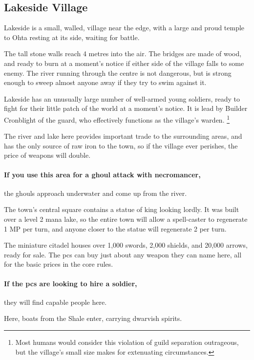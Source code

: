 \subsection{Lakeside Village}
\label{lakeside}


Lakeside is a small, walled, village near the \gls{edge}, with a large and proud temple to Ohta resting at its side, waiting for battle.

The tall stone walls reach 4 metres into the air.
The bridges are made of wood, and ready to burn at a moment's notice if either side of the village falls to some enemy.
The river running through the centre is not dangerous, but is strong enough to sweep almost anyone away if they try to swim against it.

Lakeside has an unusually large number of well-armed young soldiers, ready to fight for their little patch of the world at a moment's notice.
It is lead by Builder Cronblight of the \gls{guard}, who effectively functions as the \gls{village}'s \gls{warden}.%
\footnote{Most humans would consider this violation of guild separation outrageous, but the \gls{village}'s small size makes for extenuating circumstances.}

The river and lake here provides important trade to the surrounding areas, and has the only source of raw iron to the town, so if the \gls{village} ever perishes, the price of weapons will double.

\paragraph{If you use this area for a ghoul attack with \gls{necromancer},}
the ghouls approach underwater and come up from the river.


The town's central square contains a statue of \gls{king} looking lordly.
It was built over a level 2 mana lake, so the entire town will allow a spell-caster to regenerate 1 MP per turn, and anyone closer to the statue will regenerate 2 per turn.


The miniature citadel houses over 1,000 swords, 2,000 shields, and 20,000 arrows, ready for sale.
The \glspl{pc} can buy just about any weapon they can name here, all for the basic prices in the core rules.

\paragraph{If the \glspl{pc} are looking to hire a soldier,}
they will find capable people here.


Here, boats from the Shale enter, carrying dwarvish spirits.

